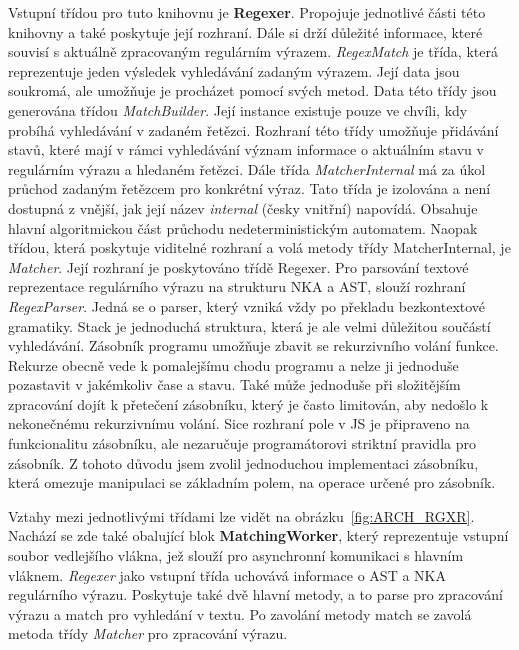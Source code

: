 Vstupní třídou pro tuto knihovnu je \textbf{Regexer}. 
Propojuje jednotlivé části této knihovny a také poskytuje její rozhraní.
Dále si drží důležité informace, které souvisí s aktuálně zpracovaným regulárním výrazem.
\textit{RegexMatch} je třída, která reprezentuje jeden výsledek vyhledávání zadaným výrazem.
Její data jsou soukromá, ale umožňuje je procházet pomocí svých metod.
Data této třídy jsou generována třídou \textit{MatchBuilder}.
Její instance existuje pouze ve chvíli, kdy probíhá vyhledávání v zadaném řetězci.
Rozhraní této třídy umožňuje přidávání stavů, které mají v rámci vyhledávání význam informace o aktuálním stavu v regulárním výrazu a hledaném řetězci.
Dále třída \textit{MatcherInternal} má za úkol průchod zadaným řetězcem pro konkrétní výraz.
Tato třída je izolována a není dostupná z vnější, jak její název \textit{internal} (česky vnitřní) napovídá.
Obsahuje hlavní algoritmickou část průchodu nedeterministickým automatem.
Naopak třídou, která poskytuje viditelné rozhraní a volá metody třídy MatcherInternal, je \textit{Matcher}.
Její rozhraní je poskytováno třídě Regexer.
Pro parsování textové reprezentace regulárního výrazu na strukturu NKA a AST, slouží rozhraní \textit{RegexParser}.
Jedná se o parser, který vzniká vždy po překladu bezkontextové gramatiky.
Stack je jednoduchá struktura, která je ale velmi důležitou součástí vyhledávání.
Zásobník programu umožňuje zbavit se rekurzivního volání funkce.
Rekurze obecně vede k pomalejšímu chodu programu a nelze ji jednoduše pozastavit v jakémkoliv čase a stavu.
Také může jednoduše při složitějším zpracování dojít k přetečení zásobníku, který je často limitován, aby nedošlo k nekonečnému rekurzivnímu volání.
Sice rozhraní pole v JS je připraveno na funkcionalitu zásobníku, ale nezaručuje programátorovi striktní pravidla pro zásobník. 
Z tohoto důvodu jsem zvolil jednoduchou implementaci zásobníku, která omezuje manipulaci se základním polem, na operace určené pro zásobník.

Vztahy mezi jednotlivými třídami lze vidět na obrázku~\ref{fig:ARCH_RGXR}. 
Nachází se zde také obalující blok \textbf{MatchingWorker}, který reprezentuje vstupní soubor vedlejšího vlákna, jež slouží pro asynchronní komunikaci s hlavním vláknem.
\textit{Regexer} jako vstupní třída uchovává informace o AST a NKA regulárního výrazu.
Poskytuje také dvě hlavní metody, a to parse pro zpracování výrazu a match pro vyhledání v textu.
Po zavolání metody match se zavolá metoda třídy \textit{Matcher} pro zpracování výrazu.


